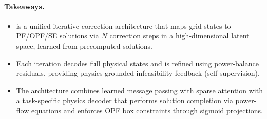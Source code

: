 \begin{boxH}
\paragraph{Takeaways.}
\begin{itemize}
\item \genco is a unified iterative correction architecture that maps grid states to PF/OPF/SE solutions via $N$ correction steps in a high-dimensional latent space, learned from precomputed solutions.
\item Each iteration decodes full physical states and is refined using power-balance residuals, providing physics-grounded infeasibility feedback (self-supervision).
\item The architecture combines learned message passing with sparse attention with a task-specific physics decoder that performs solution completion via power-flow equations and enforces OPF box constraints through sigmoid projections.
\end{itemize}
\end{boxH}